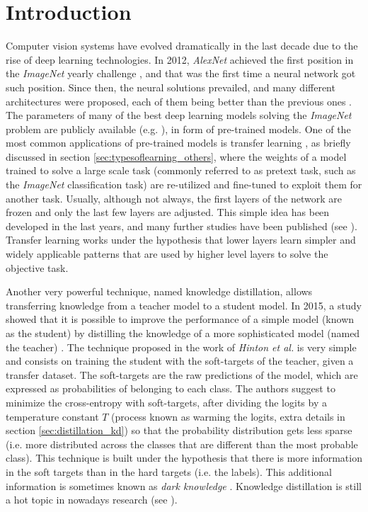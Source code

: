  \section{Introduction}
 Computer vision systems have evolved dramatically in the last decade due to the rise of deep learning technologies. In 2012, \textit{AlexNet} \autocite{krizhevsky2012} achieved the first position in the \textit{ImageNet} yearly challenge \autocite{ILSVRC15}, and that was the first time a neural network got such position. Since then, the neural solutions prevailed, and many different architectures were proposed, each of them being better than the previous ones \autocite{khan2020, algan2021}. The parameters of many of the best deep learning models solving the \textit{ImageNet} problem are publicly available (e.g. \autocite{kaiming2016, chollet2017, szegedy2016, szegedy2017, howard2017, pham2018, tan2019}), in form of pre-trained models. One of the most common applications of pre-trained models is transfer learning \autocite{huang2021}, as briefly discussed in section \ref{sec:typesoflearning_others}, where the weights of a model  trained to solve a large scale task (commonly referred to as pretext task, such as the \textit{ImageNet} classification task) are re-utilized and fine-tuned to exploit them for another task. Usually, although not always, the first layers of the network are frozen and only the last few layers 
 are adjusted. This simple idea has been developed in the last years, and many further studies have been published (see \autocite{evci2022, zhu2018, wu2021, pzhao2021}). Transfer learning works under the hypothesis that lower layers learn simpler and widely applicable patterns that are used by higher level layers to solve the objective task.

 Another very powerful technique, named knowledge distillation, allows transferring knowledge from a teacher model to a student model. In 2015, a study showed that it is possible to improve the performance of a simple model (known as the student) by distilling the knowledge of a more sophisticated model (named the teacher) \autocite{hinton2015}. The technique proposed in the work of \textit{Hinton et al.} is very simple and consists on training the student with the soft-targets of the teacher, given a transfer dataset. The soft-targets are the raw predictions of the model, which are expressed as probabilities of belonging to each class. The authors suggest to minimize the cross-entropy with soft-targets, after dividing the logits by a temperature constant $T$ (process known as warming the logits, extra details in section \ref{sec:distillation_kd}) so that the probability distribution gets less sparse (i.e. more distributed across the classes that are different than the most probable class). This technique is built under the hypothesis that there is more information in the soft targets than in the hard targets (i.e. the labels). This additional information is sometimes known as \textit{dark knowledge} \autocite{gou2020}. Knowledge distillation is still a hot topic in nowadays research (see \autocite{tan2021, zhao2021, lee2021}).

